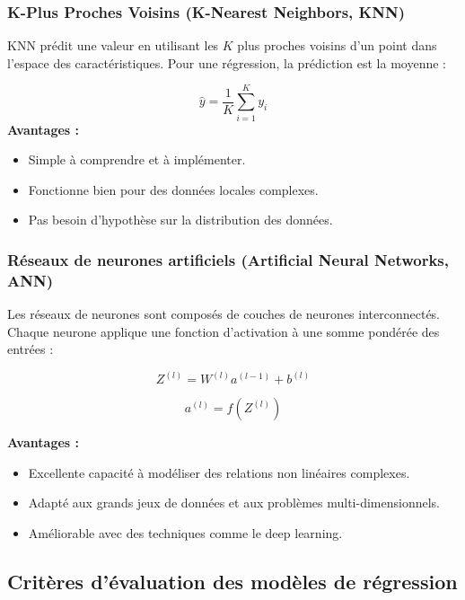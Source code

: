 \subsubsection{K-Plus Proches Voisins (K-Nearest Neighbors, KNN)}

KNN pr\'edit une valeur en utilisant les \(K\) plus proches voisins d'un point dans l'espace des caract\'eristiques. Pour une r\'egression, la pr\'ediction est la moyenne :

\begin{equation}
\hat{y} = \frac{1}{K} \sum_{i=1}^{K} y_i
\end{equation}
\textbf{Avantages :}
\begin{itemize}
	\item Simple \`a comprendre et \`a impl\'ementer.
	\item Fonctionne bien pour des donn\'ees locales complexes.
	\item Pas besoin d'hypoth\`ese sur la distribution des donn\'ees.
\end{itemize}

\subsubsection{R\'eseaux de neurones artificiels (Artificial Neural Networks, ANN)}

Les r\'eseaux de neurones sont compos\'es de couches de neurones interconnect\'es. Chaque neurone applique une fonction d'activation \`a une somme pond\'er\'ee des entr\'ees :

\begin{equation}
Z^{(l)} = W^{(l)} a^{(l-1)} + b^{(l)}
\end{equation}

\begin{equation}
a^{(l)} = f(Z^{(l)})
\end{equation}



\textbf{Avantages :}
\begin{itemize}
	\item Excellente capacit\'e \`a mod\'eliser des relations non lin\'eaires complexes.
	\item Adapt\'e aux grands jeux de donn\'ees et aux probl\`emes multi-dimensionnels.
	\item Am\'eliorable avec des techniques comme le deep learning.
\end{itemize}


\subsection{Critères d'évaluation des modèles de régression}

